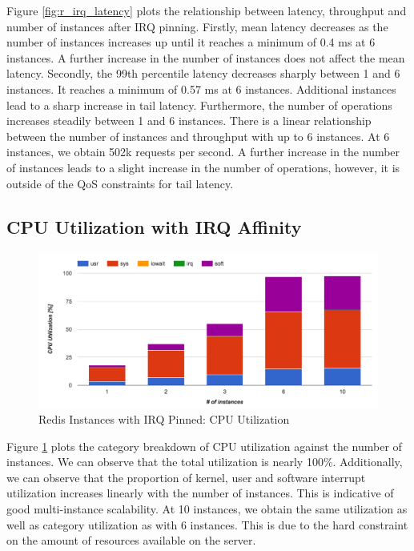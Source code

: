 Figure \ref{fig:r_irq_latency} plots the relationship between latency, throughput and number of instances after IRQ pinning. Firstly, mean latency decreases as the number of instances increases up until it reaches a minimum of 0.4 ms at 6 instances. A further increase in the number of instances does not affect the mean latency. Secondly, the 99th percentile latency decreases sharply between 1 and 6 instances. It reaches a minimum of 0.57 ms at 6 instances. Additional instances lead to a sharp increase in tail latency. Furthermore, the number of operations increases steadily between 1 and 6 instances. There is a linear relationship between the number of instances and throughput with up to 6 instances. At 6 instances, we obtain 502k requests per second. A further increase in the number of instances leads to a slight increase in the number of operations, however, it is outside of the QoS constraints for tail latency.

\subsection{CPU Utilization with IRQ Affinity}
\begin{figure}[h]
    \includegraphics[width=\textwidth]{./res2/r_irq_cpu.png}
    \caption{Redis Instances with IRQ Pinned: CPU Utilization}
    \label{fig:r_irq_cpu}
\end{figure}

Figure \ref{fig:r_irq_cpu} plots the category breakdown of CPU utilization against the number of instances. We can observe that the total utilization is nearly 100\%. Additionally, we can observe that the proportion of kernel, user and software interrupt utilization increases linearly with the number of instances. This is indicative of good multi-instance scalability. At 10 instances, we obtain the same utilization as well as category utilization as with 6 instances. This is due to the hard constraint on the amount of resources available on the server.

